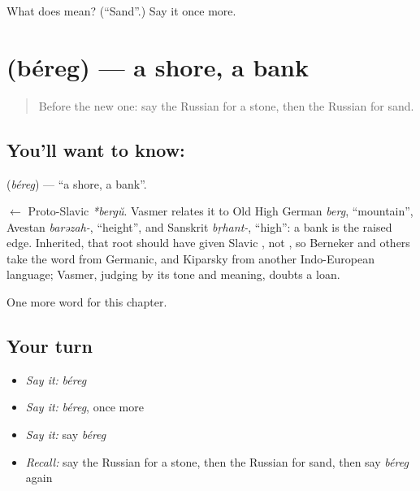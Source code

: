 \begin{tcolorbox}[breakable,colback=teal!4,colframe=teal!35!black,title={Before you move on}]
What does  mean? (\textquotedblleft{}Sand\textquotedblright{}.) Say it once more.
\end{tcolorbox}
\section[\texorpdfstring{\ru{берег} (béreg)}{берег (béreg)}]{ (béreg) — a shore, a bank}

\label{lesson:RU-C57-shore}



\begin{quote}
Before the new one: say the Russian for a stone, then the Russian for sand.
\end{quote}

\subsection*{You'll want to know: }
\textbf{} (\emph{béreg}) — \textquotedblleft{}a shore, a bank\textquotedblright{}.

\begin{cousinweb}
\textbf{} $\leftarrow$ Proto-Slavic \emph{*bergŭ}. Vasmer relates it to Old High German \emph{berg}, \textquotedblleft{}mountain\textquotedblright{}, Avestan \emph{barəzah-}, \textquotedblleft{}height\textquotedblright{}, and Sanskrit \emph{bṛhant-}, \textquotedblleft{}high\textquotedblright{}: a bank is the raised edge. Inherited, that root should have given Slavic \emph{}, not \emph{}, so Berneker and others take the word from Germanic, and Kiparsky from another Indo-European language; Vasmer, judging by its tone and meaning, doubts a loan.
\end{cousinweb}

\begin{grammarlens}[title={What you've built}]
One more word for this chapter.
\end{grammarlens}

\subsection*{Your turn}
\begin{itemize}
\raggedright
  \item \emph{Say it:} \emph{béreg}
  \item \emph{Say it:} \emph{béreg}, once more
  \item \emph{Say it:} say \emph{béreg}
  \item \emph{Recall:} say the Russian for a stone, then the Russian for sand, then say \emph{béreg} again
\end{itemize}

